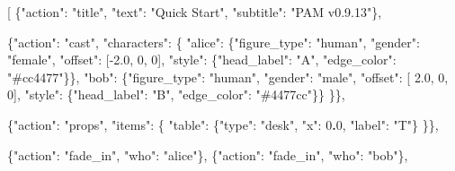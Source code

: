 \documentclass[
  12pt,
  letterpaper,
]{book}
\newenvironment{Shaded}{}{}
\newcommand{\DataTypeTok}[1]{\textcolor[rgb]{0.56,0.13,0.00}{#1}}
\newcommand{\DecValTok}[1]{\textcolor[rgb]{0.25,0.63,0.44}{#1}}
\newcommand{\ErrorTok}[1]{\textcolor[rgb]{1.00,0.00,0.00}{\textbf{#1}}}
\newcommand{\FloatTok}[1]{\textcolor[rgb]{0.25,0.63,0.44}{#1}}
\newcommand{\FunctionTok}[1]{\textcolor[rgb]{0.02,0.16,0.49}{#1}}
\newcommand{\OtherTok}[1]{\textcolor[rgb]{0.00,0.44,0.13}{#1}}
\newcommand{\StringTok}[1]{\textcolor[rgb]{0.25,0.44,0.63}{#1}}
\begin{document}
\begin{Shaded}
\begin{Highlighting}[]
\OtherTok{[}
  \FunctionTok{\{}\DataTypeTok{"action"}\FunctionTok{:} \StringTok{"title"}\FunctionTok{,} \DataTypeTok{"text"}\FunctionTok{:} \StringTok{"Quick Start"}\FunctionTok{,} \DataTypeTok{"subtitle"}\FunctionTok{:} \StringTok{"PAM v0.9.13"}\FunctionTok{\}}\OtherTok{,}

  \FunctionTok{\{}\DataTypeTok{"action"}\FunctionTok{:} \StringTok{"cast"}\FunctionTok{,} \DataTypeTok{"characters"}\FunctionTok{:} \FunctionTok{\{}
    \DataTypeTok{"alice"}\FunctionTok{:} \FunctionTok{\{}\DataTypeTok{"figure\_type"}\FunctionTok{:} \StringTok{"human"}\FunctionTok{,} \DataTypeTok{"gender"}\FunctionTok{:} \StringTok{"female"}\FunctionTok{,}
              \DataTypeTok{"offset"}\FunctionTok{:} \OtherTok{[}\FloatTok{{-}2.0}\OtherTok{,} \DecValTok{0}\OtherTok{,} \DecValTok{0}\OtherTok{]}\FunctionTok{,}
              \DataTypeTok{"style"}\FunctionTok{:} \FunctionTok{\{}\DataTypeTok{"head\_label"}\FunctionTok{:} \StringTok{"A"}\FunctionTok{,} \DataTypeTok{"edge\_color"}\FunctionTok{:} \StringTok{"\#cc4477"}\FunctionTok{\}\},}
    \DataTypeTok{"bob"}\FunctionTok{:}   \FunctionTok{\{}\DataTypeTok{"figure\_type"}\FunctionTok{:} \StringTok{"human"}\FunctionTok{,} \DataTypeTok{"gender"}\FunctionTok{:} \StringTok{"male"}\FunctionTok{,}
              \DataTypeTok{"offset"}\FunctionTok{:} \OtherTok{[} \FloatTok{2.0}\OtherTok{,} \DecValTok{0}\OtherTok{,} \DecValTok{0}\OtherTok{]}\FunctionTok{,}
              \DataTypeTok{"style"}\FunctionTok{:} \FunctionTok{\{}\DataTypeTok{"head\_label"}\FunctionTok{:} \StringTok{"B"}\FunctionTok{,} \DataTypeTok{"edge\_color"}\FunctionTok{:} \StringTok{"\#4477cc"}\FunctionTok{\}\}}
  \FunctionTok{\}\}}\OtherTok{,}

  \FunctionTok{\{}\DataTypeTok{"action"}\FunctionTok{:} \StringTok{"props"}\FunctionTok{,} \DataTypeTok{"items"}\FunctionTok{:} \FunctionTok{\{}
    \DataTypeTok{"table"}\FunctionTok{:} \FunctionTok{\{}\DataTypeTok{"type"}\FunctionTok{:} \StringTok{"desk"}\FunctionTok{,} \DataTypeTok{"x"}\FunctionTok{:} \DecValTok{0}\ErrorTok{.}\DecValTok{0}\FunctionTok{,} \DataTypeTok{"label"}\FunctionTok{:} \StringTok{"T"}\FunctionTok{\}}
  \FunctionTok{\}\}}\OtherTok{,}

  \FunctionTok{\{}\DataTypeTok{"action"}\FunctionTok{:} \StringTok{"fade\_in"}\FunctionTok{,} \DataTypeTok{"who"}\FunctionTok{:} \StringTok{"alice"}\FunctionTok{\}}\OtherTok{,}
  \FunctionTok{\{}\DataTypeTok{"action"}\FunctionTok{:} \StringTok{"fade\_in"}\FunctionTok{,} \DataTypeTok{"who"}\FunctionTok{:} \StringTok{"bob"}\FunctionTok{\}}\OtherTok{,}


\end{Highlighting}
\end{Shaded}
\end{document}
